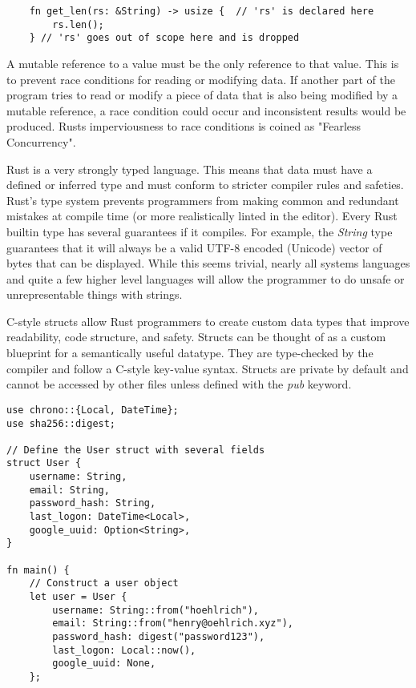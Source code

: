 \documentclass[12pt]{article}
\begin{document}
\begin{flushleft}
\begin{verbatim}
    fn get_len(rs: &String) -> usize {  // 'rs' is declared here
        rs.len();
    } // 'rs' goes out of scope here and is dropped
\end{verbatim}
\doublespacing{}

A mutable reference to a value must be the only reference to that value. This
is to prevent race conditions for reading or modifying data. If another part of
the program tries to read or modify a piece of data that is also being modified
by a mutable reference, a race condition could occur and inconsistent results
would be produced. Rusts imperviousness to race conditions is coined as
"Fearless Concurrency". 


Rust is a very strongly typed language. This means that data must have a
defined or inferred type and must conform to stricter compiler rules and
safeties. Rust's type system prevents programmers from making common and
redundant mistakes at compile time (or more realistically linted in the
editor). Every Rust builtin type has several guarantees if it compiles. For
example, the \textit{String} type guarantees that it will always be a valid
UTF-8 encoded (Unicode) vector of bytes that can be displayed. While this seems
trivial, nearly all systems languages and quite a few higher level languages
will allow the programmer to do unsafe or unrepresentable things with strings.

C-style structs allow Rust programmers to create custom data types that improve
readability, code structure, and safety. Structs can be thought of as a custom
blueprint for a semantically useful datatype. They are type-checked by the
compiler and follow a C-style key-value syntax. Structs are private by default
and cannot be accessed by other files unless defined with the \textit{pub}
keyword.

\singlespacing{}
\begin{verbatim}
use chrono::{Local, DateTime};
use sha256::digest;

// Define the User struct with several fields
struct User {
    username: String,
    email: String,
    password_hash: String,
    last_logon: DateTime<Local>,
    google_uuid: Option<String>,
}

fn main() {
    // Construct a user object
    let user = User {
        username: String::from("hoehlrich"),
        email: String::from("henry@oehlrich.xyz"),
        password_hash: digest("password123"),
        last_logon: Local::now(),
        google_uuid: None,
    };


\end{verbatim}
\end{flushleft}
\end{document}
